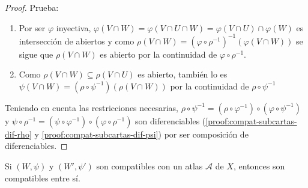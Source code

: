 \documentclass[../VD.tex]{subfiles}
\begin{document}
\begin{proof}
  Prueba:
  \begin{enumerate}
  \item[\ref{proof:compat-subcartas-ab-rho}.] Por ser \(\varphi\) inyectiva,
    \(\varphi(V \cap W) = \varphi(V \cap U \cap W) = \varphi(V \cap U) \cap
    \varphi(W)\) es intersección de abiertos y como \(\rho(V \cap W) = (\varphi
    \circ \rho^{-1})^{-1}(\varphi(V \cap W))\) se sigue que \(\rho(V \cap W)\)
    es abierto por la continuidad de \(\varphi \circ \rho^{-1}\).
  \item[\ref{proof:compat-subcartas-ab-psi}.] Como \(\rho(V \cap W) \subseteq
    \rho(V \cap U)\) es abierto, también lo es \(\psi(V \cap W) = (\rho \circ
    \psi^{-1})(\rho(V \cap W))\) por la continuidad de \(\rho \circ \psi^{-1}\)
  \end{enumerate}
  Teniendo en cuenta las restricciones necesarias, \(\rho \circ \psi^{-1} =
  (\rho \circ \varphi^{-1}) \circ (\varphi \circ \psi^{-1})\) y \(\psi \circ
  \rho^{-1} = (\psi \circ \varphi^{-1}) \circ (\varphi \circ \rho^{-1})\) son
  diferenciables (\ref{proof:compat-subcartas-dif-rho} y
  \ref{proof:compat-subcartas-dif-psi}) por ser composición de diferenciables.
\end{proof}

\begin{lemma}
  \label{lem:compat-trans-atlas}
  Si \((W, \psi)\) y \((W', \psi')\) son compatibles con un atlas \(\mathcal{A}\) de
  \(X\), entonces son compatibles entre sí.
\end{lemma}
\end{document}
